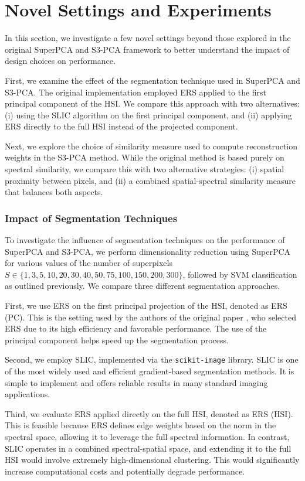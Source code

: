 \documentclass[twoside,english]{article}
\begin{document}
\section{Novel Settings and Experiments} \label{sec:novel}
In this section, we investigate a few novel settings beyond those explored in the original SuperPCA and S3-PCA framework to better understand the impact of design choices on performance.

First, we examine the effect of the segmentation technique used in SuperPCA and S3-PCA. The original implementation employed ERS applied to the first principal component of the HSI. We compare this approach with two alternatives: (i) using the SLIC algorithm on the first principal component, and (ii) applying ERS directly to the full HSI instead of the projected component.

Next, we explore the choice of similarity measure used to compute reconstruction weights in the S3-PCA method. While the original method is based purely on spectral similarity, we compare this with two alternative strategies: (i) spatial proximity between pixels, and (ii) a combined spatial-spectral similarity measure that balances both aspects. 

\subsubsection{Impact of Segmentation Techniques}

To investigate the influence of segmentation techniques on the performance of SuperPCA and S3-PCA, we perform dimensionality reduction using SuperPCA for various values of the number of superpixels $S \in \{1, 3, 5, 10, 20, 30, 40, 50, 75, 100, 150, 200, 300\}$, followed by SVM classification as outlined previously. We compare three different segmentation approaches.

First, we use ERS on the first principal projection of the HSI, denoted as ERS (PC). This is the setting used by the authors of the original paper \citep{SuperPCA, S3PCA}, who selected ERS due to its high efficiency and favorable performance. The use of the principal component helps speed up the segmentation process.

Second, we employ SLIC, implemented via the \texttt{scikit-image} library. SLIC is one of the most widely used and efficient gradient-based segmentation methods. It is simple to implement and offers reliable results in many standard imaging applications.

Third, we evaluate ERS applied directly on the full HSI, denoted as ERS (HSI). This is feasible because ERS defines edge weights based on the norm in the spectral space, allowing it to leverage the full spectral information. In contrast, SLIC operates in a combined spectral-spatial space, and extending it to the full HSI would involve extremely high-dimensional clustering. This would significantly increase computational costs and potentially degrade performance.
\end{document}

